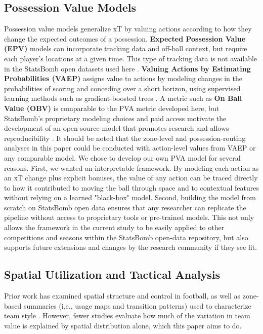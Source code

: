 \documentclass[12pt,a4paper]{article}
\begin{document}
\subsection{Possession Value Models}
Possession value models generalize xT by valuing actions according to how they change the expected outcomes of a possession. \textbf{Expected Possession Value (EPV)} models can incorporate tracking data and off-ball context, but require each player’s locations at a given time. This type of tracking data is not available in the StatsBomb open datasets used here \cite{fernandez2019wide}. \textbf{Valuing Actions by Estimating Probabilities (VAEP)} assigns value to actions by modeling changes in the probabilities of scoring and conceding over a short horizon, using supervised learning methods such as gradient-boosted trees \cite{decroos2019vaep}. A metric such as \textbf{On Ball Value (OBV)} is comparable to the PVA metric developed here, but StatsBomb’s proprietary modeling choices and paid access motivate the development of an open-source model that promotes research and allows reproducibility \cite{statsbomb_obv}. It should be noted that the zone-level and possession-routing analyses in this paper could be conducted with action-level values from VAEP or any comparable model. We chose to develop our own PVA model for several reasons. First, we wanted an interpretable framework. By modeling each action as an xT change plus explicit bonuses, the value of any action can be traced directly to how it contributed to moving the ball through space and to contextual features without relying on a learned "black-box" model. Second, building the model from scratch on StatsBomb open data ensures that any researcher can replicate the pipeline without access to proprietary tools or pre-trained models. This not only allows the framework in the current study to be easily applied to other competitions and seasons within the StatsBomb open-data repository, but also supports future extensions and changes by the research community if they see fit.

\subsection{Spatial Utilization and Tactical Analysis}
Prior work has examined spatial structure and control in football, as well as zone-based summaries (i.e., usage maps and transition patterns) used to characterize team style \cite{amichay2025spatial, gu2024spacecontrol}. However, fewer studies evaluate how much of the variation in team value is explained by spatial distribution alone, which this paper aims to do.
\end{document}
